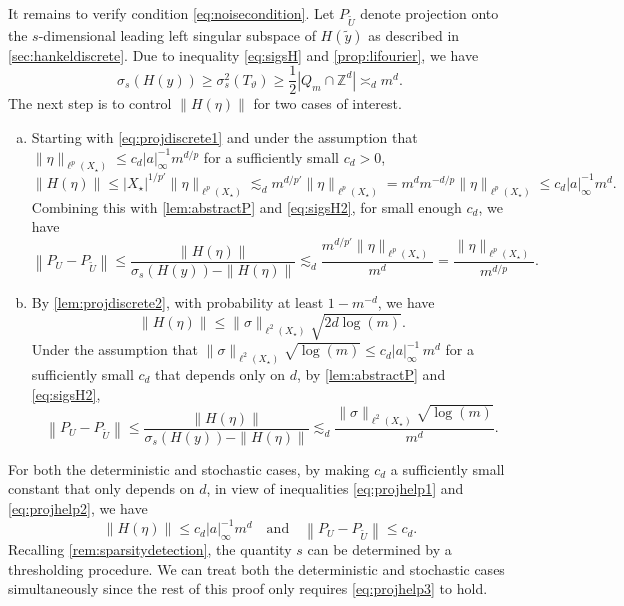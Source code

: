 \documentclass[11pt]{article}
\theoremstyle{definition}
\numberwithin{theorem}{section}
\numberwithin{lemma}{section}
\numberwithin{equation}{section}
\def\Z{\mathbb{Z}}
\renewcommand{\tilde}{\widetilde}
\newcommand{\sampset}{X}
\def\andspace{\quad\text{and}\quad}
\newcommand{\norm}[1]{{\left\|#1\right\|}}
\numberwithin{equation}{section}
\begin{document}
	It remains to verify condition \eqref{eq:noisecondition}. Let $P_{\tilde U}$ denote projection onto the $s$-dimensional leading left singular subspace of $H(\tilde y)$ as described in \cref{sec:hankeldiscrete}. 	Due to inequality \eqref{eq:sigsH} and \cref{prop:lifourier}, we have
	\begin{equation}
		\label{eq:sigsH2}
		\sigma_s(H(y))
		\geq \sigma_s^2(T_\vartheta)
		\geq  \frac 12 |Q_m\cap \Z^d|
		\asymp_d  m^d.
	\end{equation}
	The next step is to control $\|H(\eta)\|$ for two cases of interest.
	\begin{enumerate}[(a)]
		\item 
		Starting with \eqref{eq:projdiscrete1} and under the assumption that $\|\eta\|_{\ell^p(\sampset_\star)}\leq c_d |a|_\infty^{-1} m^{d/p}$ for a sufficiently small $c_d>0$,
		\begin{equation*}
            \|H(\eta)\|
			\leq |\sampset_\star|^{1/p'} \|\eta\|_{\ell^p(\sampset_\star)}
			\lesssim_d m^{d/p'} \|\eta\|_{\ell^p(\sampset_\star)}
			=m^{d}m^{-d/p} \|\eta\|_{\ell^p(\sampset_\star)}
			\leq c_d |a|_\infty^{-1} m^d.
		\end{equation*}
		Combining this with \cref{lem:abstractP} and \eqref{eq:sigsH2}, for small enough $c_d$, we have
		\begin{equation}
			\label{eq:projhelp1}
			\norm{P_U-P_{\tilde U}}
			\leq \frac{\|H(\eta)\|}{\sigma_s(H(y))-\|H(\eta)\|}
			\lesssim_d 
			\frac{m^{d/p'}\|\eta\|_{\ell^p(\sampset_\star)}}{ m^d}
			=\frac{\|\eta\|_{\ell^p(\sampset_\star)}}{ m^{d/p}}.
		\end{equation}
		\item 
		By \cref{lem:projdiscrete2}, with probability at least $1-m^{-d}$, we have
		$$
		\|H(\eta)\|
		\leq \|\sigma\|_{\ell^2(\sampset_\star)} \sqrt{2d\log(m)}.
		$$ 
		Under the assumption that $\|\sigma\|_{\ell^2(\sampset_\star)}\sqrt{\log(m)}\leq c_d |a|_\infty^{-1}  \, m^d$ for a sufficiently small $c_d$ that depends only on $d$, by \cref{lem:abstractP} and \eqref{eq:sigsH2},
		\begin{equation}
			\label{eq:projhelp2}
			\norm{P_U-P_{\tilde U}}
			\leq \frac{\|H(\eta)\|}{\sigma_s(H(y))-\|H(\eta)\|}
			\lesssim_d \frac{\|\sigma\|_{\ell^2(\sampset_\star)} \sqrt{\log(m)}}{{ m^d}}.
		\end{equation}
	\end{enumerate}
	For both the deterministic and stochastic cases, by making $c_d$ a sufficiently small constant that only depends on $d$, in view of inequalities \eqref{eq:projhelp1} and \eqref{eq:projhelp2}, we have
	\begin{equation}
		\label{eq:projhelp3}
		\|H(\eta)\|\leq c_d |a|_\infty^{-1} m^d \andspace
        \norm{P_U-P_{\tilde U}}
		\leq c_d.
	\end{equation}
    Recalling \cref{rem:sparsitydetection}, the quantity $s$ can be determined by a thresholding procedure. We can treat both the deterministic and stochastic cases simultaneously since the rest of this proof only requires \eqref{eq:projhelp3} to hold. 
	
\end{document}
